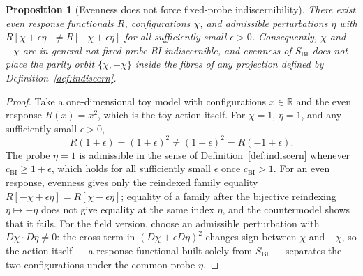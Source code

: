 \documentclass[11pt,a4paper]{article}
\newtheorem{proposition}[theorem]{Proposition}
\newcommand{\chifield}{\chi}
\newcommand{\cchi}{c_{\mathrm{BI}}}
\begin{document}
    \begin{proposition}[Evenness does not force fixed-probe indiscernibility]
      \label{prop:no-pointwise}
      There exist even response functionals $R$, configurations $\chifield$, and admissible
      perturbations $\eta$ with
      $R[\chifield + \epsilon\eta] \neq R[-\chifield + \epsilon\eta]$ for all sufficiently
      small $\epsilon > 0$.
      Consequently, $\chifield$ and $-\chifield$ are in general \emph{not} fixed-probe
      BI-indiscernible, and evenness of $S_{\mathrm{BI}}$ does not place the parity orbit
      $\{\chifield,-\chifield\}$ inside the fibres of any projection defined by
      Definition~\ref{def:indiscern}.
    \end{proposition}

    \begin{proof}
      Take a one-dimensional toy model with configurations $x \in \mathbb{R}$ and the even
      response $R(x) = x^{2}$, which is the toy action itself.
      For $\chifield = 1$, $\eta = 1$, and any sufficiently small $\epsilon > 0$,
      \[
        R(1+\epsilon) = (1+\epsilon)^{2}
        \neq (1-\epsilon)^{2} = R(-1+\epsilon).
      \]
      The probe $\eta = 1$ is admissible in the sense of Definition~\ref{def:indiscern}
      whenever $\cchi \geq 1 + \epsilon$, which holds for all sufficiently small $\epsilon$
      once $\cchi > 1$.
      For an even response, evenness gives only the reindexed family equality
      $R[-\chifield + \epsilon\eta] = R[\chifield - \epsilon\eta]$; equality of a family
      after the bijective reindexing $\eta \mapsto -\eta$ does not give equality at the same
      index $\eta$, and the countermodel shows that it fails.
      For the field version, choose an admissible perturbation with
      $D\chifield \cdot D\eta \neq 0$: the cross term in
      $(D\chifield + \epsilon D\eta)^{2}$ changes sign between $\chifield$ and $-\chifield$,
      so the action itself --- a response functional built solely from $S_{\mathrm{BI}}$ ---
      separates the two configurations under the common probe $\eta$.
    \end{proof}
\end{document}
